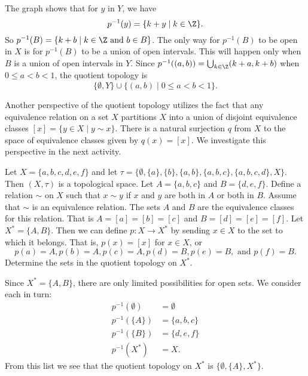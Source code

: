 \item The graph shows that for $y$ in $Y$, we have 
\[p^{-1}(y) = \{k+y \mid k \in \Z\}.\]
So $p^{-1}(B) = \{k+b \mid k \in \Z \text{ and } b \in B\}$. The only way for $p^{-1}(B)$ to be open in $X$ is for $p^{-1}(B)$ to be a union of open intervals. This will happen only when $B$ is a union of open intervals in $Y$. Since $p^{-1}((a,b)) = \bigcup_{k \in \Z} (k+a, k+b)$ when $0 \leq a < b < 1$, the quotient topology is 
\[\{\emptyset,Y\} \cup \{(a,b) \mid 0 \leq a < b < 1\}.\]


\ea


Another perspective of the quotient topology utilizes the fact that any equivalence relation on a set $X$ partitions $X$ into a union of disjoint equivalence classes $[x] = \{y \in X \mid y \sim x\}$. There is a natural surjection $q$ from $X$ to the space of equivalence classes given by $q(x) = [x]$. We investigate this perspective in the next activity.

\begin{activity} \label{act:quotient_er} Let $X = \{a,b,c,d,e,f\}$ and let $\tau = \{\emptyset, \{a\}, \{b\}, \{a, b\}, \{a, b, c\}, \{a, b, c, d\}, X\}$. Then $(X, \tau)$ is a topological space. Let $A = \{a, b, c\}$ and $B = \{d,e,f\}$. Define a relation $\sim$ on $X$ such that $x \sim y$ if $x$ and $y$ are both in $A$ or both in $B$. Assume that $\sim$ is an equivalence relation. The sets $A$ and $B$ are the equivalence classes for this relation. That is $A = [a] = [b] = [c]$ and $B = [d] = [e] = [f]$. Let $X^* = \{A,B\}$. Then we can define $p : X \to X^*$ by sending $x \in X$ to the set to which it belongs. That is, $p(x) = [x]$ for $x \in X$, or 
\[p(a) = A, p(b) = A, p(c) = A, p(d) = B, p(e) = B, \text{ and } p(f) = B.\]
Determine the sets in the quotient topology on $X^*$. 
\end{activity}


\ActivitySolution Since $X^{*} = \{A,B\}$, there are only limited possibilities for open sets. We consider each in turn: 
\begin{align*}
p^{-1}(\emptyset) &= \emptyset \\
p^{-1}(\{A\}) &= \{a,b,c\} \\
p^{-1}(\{B\}) &= \{d,e,f\} \\
p^{-1}(X^{*}) &= X.
\end{align*}
From this list we see that the quotient topology on $X^{*}$ is $\{\emptyset, \{A\}, X^{*}\}$. 

